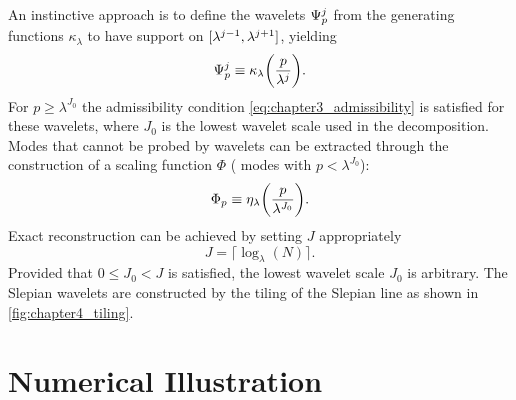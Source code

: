 An instinctive approach is to define the wavelets \({\Psi}_{p}^{j}\) from the generating functions \(\kappa_{\lambda}\) to have support on \(\interval{\lambda^{j-1}}{\lambda^{j+1}}\), yielding
%
\begin{equation}
	{\Psi}_{p}^{j}
	\equiv \kappa_{\lambda}\bigg(\frac{p}{\lambda^{j}}\bigg).
\end{equation}
%
For \(p \geq \lambda^{J_{0}}\) the admissibility condition \cref{eq:chapter3_admissibility} is satisfied for these wavelets, where \(J_{0}\) is the lowest wavelet scale used in the decomposition.
Modes that cannot be probed by wavelets can be extracted through the construction of a scaling function \(\Phi{}\) (\ie{} modes with \(p < \lambda^{J_{0}}\)):
%
\begin{equation}
	{\Phi}_{p}
	\equiv \eta_{\lambda}\bigg(\frac{p}{\lambda^{J_{0}}}\bigg).
\end{equation}
%
Exact reconstruction can be achieved by setting \(J\) appropriately
%
\begin{equation}
	J = \lceil{} \log_{\lambda}(N)\rceil{}.
\end{equation}
%
Provided that \(0 \leq J_{0} < J\) is satisfied, the lowest wavelet scale \(J_{0}\) is arbitrary.
The Slepian wavelets are constructed by the tiling of the Slepian line as shown in \cref{fig:chapter4_tiling}.



\section{Numerical Illustration}












